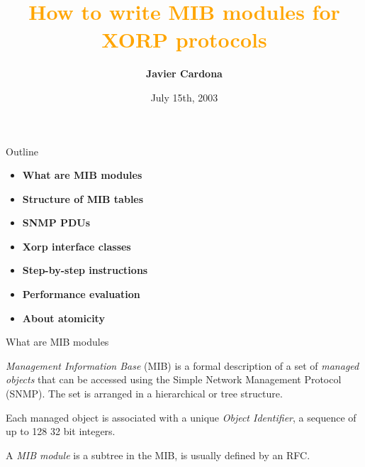 \documentclass[final,slideColor,colorBG,pdf,fyma]{prosper}
\title{
	\vspace*{.1in} \Huge \textcolor{Orange}{
		\textbf{How to write MIB modules for XORP protocols
		}
	}
}
\subtitle{}
\author{
	{\large\textbf{Javier Cardona}
	}
}
\date{July 15th, 2003}
\begin{document}
\maketitle



\begin{slide}{Outline}
	\begin{itemize}
		\item \textbf{What are MIB modules}
		\item \textbf{Structure of MIB tables}
		\item \textbf{SNMP PDUs}
		\item \textbf{Xorp interface classes}
		\item \textbf{Step-by-step instructions}
		\item \textbf{Performance evaluation}
		\item \textbf{About atomicity}
	\end{itemize}
\end{slide}

\begin{slide}{What are MIB modules}

  \twocolumn
  \begin{floatingfigure}{35mm}
    \begin{figure}
    \end{figure}
  \end{floatingfigure}

  \vspace*{.2in}
  \emph{Management Information Base} (MIB) is a 
  formal description of a set of \emph{managed 
  objects} that can be accessed using the Simple  
  Network Management Protocol (SNMP).  The set is 
  arranged in a hierarchical or tree structure. 

  \vspace*{.2in}
  Each managed object is associated with a unique \emph{Object Identifier}, a
  sequence of up to 128 32 bit integers.

  \vspace*{.2in}
  A \emph{MIB module} is a subtree in the MIB, is usually defined by an RFC.
  
\end{slide}
\end{document}
